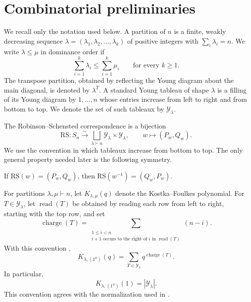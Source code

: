 \section{Combinatorial preliminaries}
\label{chapter_combinatorics}

We recall only the notation used below. A partition of $n$ is a finite,
weakly decreasing sequence $\lambda=(\lambda_1,\lambda_2,\ldots,\lambda_k)$
of positive integers with $\sum_i\lambda_i=n$. We write $\lambda\leq
\mu$ in dominance order if
\[
  \sum_{i=1}^k\lambda_i\leq\sum_{i=1}^k\mu_i
  \qquad\text{for every }k\geq 1.
\]
The transpose partition, obtained by reflecting the Young diagram about
the main diagonal, is denoted by $\lambda^T$. A standard Young tableau
of shape $\lambda$ is a filling of its Young diagram by $1,\ldots,n$
whose entries increase from left to right and from bottom to top. We
denote the set of such tableaux by $\mathcal{Y}_\lambda$.

The Robinson--Schensted correspondence
\cite{robinson1938representations,schensted1961longest} is a bijection
\[
  \mathrm{RS}:S_n\xrightarrow{\sim}
  \bigsqcup_{\lambda\vdash n}
  \mathcal{Y}_\lambda\times\mathcal{Y}_\lambda,
  \qquad w\longmapsto(P_w,Q_w).
\]
We use the convention in which tableaux increase from bottom to top.
The only general property needed later is the following symmetry.

\begin{proposition}[pps:]{\cite{schutzenberger1963quelques}}
  If $\mathrm{RS}(w)=(P_w,Q_w)$, then
  $\mathrm{RS}(w^{-1})=(Q_w,P_w)$.
\end{proposition}

For partitions $\lambda,\mu\vdash n$, let
$K_{\lambda,\mu}(q)$ denote the Kostka--Foulkes polynomial. For
$T\in\mathcal{Y}_\lambda$, let $\operatorname{read}(T)$ be obtained by
reading each row from left to right, starting with the top row, and set
\[
  \operatorname{charge}(T)
  =\sum_{\substack{1\leq i<n\\
      i+1\text{ occurs to the right of }i\text{ in }\operatorname{read}(T)}}
    (n-i).
\]
With this convention \cite[Chapter III, \S6]{macdonald1995symmetric},
\[
  K_{\lambda,(1^n)}(q)
  =\sum_{T\in\mathcal{Y}_\lambda}q^{\operatorname{charge}(T)}.
\]
In particular,
\[
  K_{\lambda,(1^n)}(1)=|\mathcal{Y}_\lambda|.
\]
This convention agrees with the normalization used in
.
